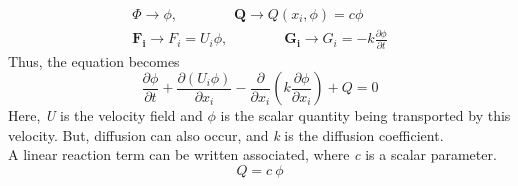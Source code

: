 \documentclass[10pt, oneside]{article}
\begin{document}
	\begin{equation}
	   \begin{aligned}
		\Phi \rightarrow \phi, \quad \quad \quad \quad \boldsymbol{Q} \rightarrow Q(x_i, \phi) = c \phi\\
		\boldsymbol{F_i} \rightarrow F_i = U_i\phi, \quad \quad \quad \quad \boldsymbol{G_i} \rightarrow G_i = -k \frac{\partial\phi}{\partial t}
	    \end{aligned}
	\end{equation}
Thus, the equation becomes
   \begin{equation}
\frac{\partial\phi}{\partial t} + \frac{\partial{(U_i\phi)}}{\partial{x_i}} - \frac{\partial}{\partial{x_i}}(k \frac{\partial\phi}{\partial{x_i}}) + Q = 0
   \end{equation}
Here, \textit{U} is the velocity field and $\phi$ is the scalar quantity being transported by this velocity. But, diffusion can also occur, and \textit{k} is the diffusion coefficient.\\
A linear reaction term can be written associated, where \textit{c} is a scalar parameter.
\[
    Q = c\ \phi
\]
\end{document}
